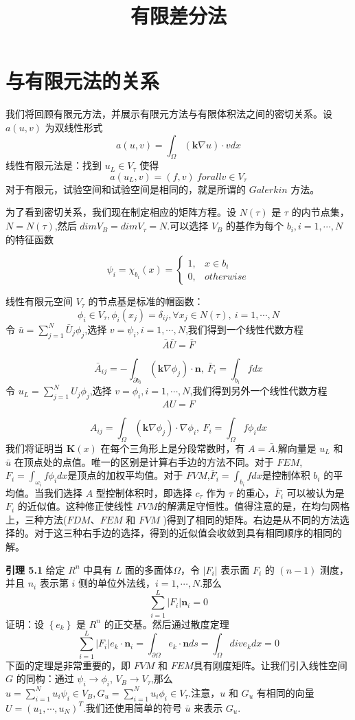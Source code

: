 \documentclass[12pt,a4paper]{article}
\title{有限差分法}
\date{\chntoday}
\begin{document}
\section{与有限元法的关系}
我们将回顾有限元方法，并展示有限元方法与有限体积法之间的密切关系。设 $a(u,v)$ 为双线性形式
$$
a(u,v)=\int_{\Omega}^{} (\textbf{k}\nabla u)\cdot v dx
$$
线性有限元法是：找到 $u_{L}\in V_{\tau}$ 使得
$$
a(u_L,v)=(f,v) ~ for all v\in V_{\tau}
$$
对于有限元，试验空间和试验空间是相同的，就是所谓的 $Galerkin$ 方法。

为了看到密切关系，我们现在制定相应的矩阵方程。设 $N(\tau)$ 是 $\tau$ 的内节点集，$N=N(\tau)$,然后 $dim V_B=dim V_{\tau}=N$.可以选择 $V_B$ 的基作为每个 $b_i,i=1,\cdots ,N$ 的特征函数

$$
\psi _i=\chi _{b_i}(x)=
\begin{cases}
1, & x\in b_i \\
0, & otherwise
\end{cases}
$$

线性有限元空间 $V_{\tau}$ 的节点基是标准的帽函数：
$$
\phi _i\in V_{\tau},\phi _i(x_j)=\delta_{ij},\forall x_j\in N(\tau),~i=1,\cdots ,N
$$
令 $\bar{u}=\sum_{j=1}^N \bar{U}_j\phi_j$,选择 $v=\psi_i,i=1,\cdots ,N$,我们得到一个线性代数方程
$$
\bar{A}\bar{U}=\bar{F}
$$

$$
\bar{A}_{ij}=-\int_{\partial b_i}^{}(\textbf{k}\nabla \phi_j)\cdot\textbf{n},~\bar{F}_i=\int_{b_i}^{} fdx
$$
令 $u_L=\sum_{j=1}^N U_j\phi_j$,选择 $v=\phi_i,i=1,\cdots ,N$,我们得到另外一个线性代数方程
$$
AU=F
$$

$$
A_{ij}=\int_{\Omega}^{}(\textbf{k}\nabla \phi_j)\cdot\nabla \phi_i,~F_i=\int_{\Omega}^{} f\phi_i dx
$$
我们将证明当 $\textbf{K}(x)$ 在每个三角形上是分段常数时，有 $A=\bar{A}$.解向量是 $u_L$ 和 $\bar{u}$ 在顶点处的点值。唯一的区别是计算右手边的方法不同。对于 $FEM$,$F_i=\int_{\omega_i}^{}f\phi_i dx$是顶点的加权平均值。对于 $FVM$,$\bar{F}_i=\int_{b_i}^{}fdx$是控制体积 $b_i$ 的平均值。当我们选择 $A$ 型控制体积时，即选择 $c_{\tau}$ 作为 $\tau$ 的重心，$\bar{F}_i$ 可以被认为是 $F_i$ 的近似值。这种修正使线性 $FVM$的解满足守恒性。值得注意的是，在均匀网格上，三种方法($FDM$、$FEM$ 和 $FVM$ )得到了相同的矩阵。右边是从不同的方法选择的。对于这三种右手边的选择，得到的近似值会收敛到具有相同顺序的相同的解。

\textbf{引理 5.1}
给定 $R^n$ 中具有 $L$ 面的多面体$\Omega$，令 $|F_i|$ 表示面 $F_i$ 的 $(n-1)$ 测度，并且 $n_i$ 表示第 $i$ 侧的单位外法线，$i=1,\cdots ,N$.那么
$$
\sum_{i=1}^L |F_i|\textbf{n}_i=0
$$
证明：设 $\left\{e_k\right\}$ 是 $R^n$ 的正交基。然后通过散度定理
$$
\sum_{i=1}^L |F_i| e_k\cdot\textbf{n}_i=\int_{\partial\Omega}^{} e_k\cdot\textbf{n}ds=\int_{\Omega}^{}div e_k dx=0
$$
下面的定理是非常重要的，即 $FVM$ 和 $FEM$具有刚度矩阵。让我们引入线性空间 $G$ 的同构：通过 $\psi _i\to\phi _i$, $V_B\to V_{\tau}$,那么 $u=\sum_{i=1}^N u_i\psi _i\in V_B,G_u=\sum_{i=1}^N u_i\phi _i\in V_{\tau}$.注意，$u$ 和 $G_u$ 有相同的向量 $U=(u_1,\cdots,u_N)^T$.我们还使用简单的符号 $\bar{u}$ 来表示 $G_u$.
\end{document}

